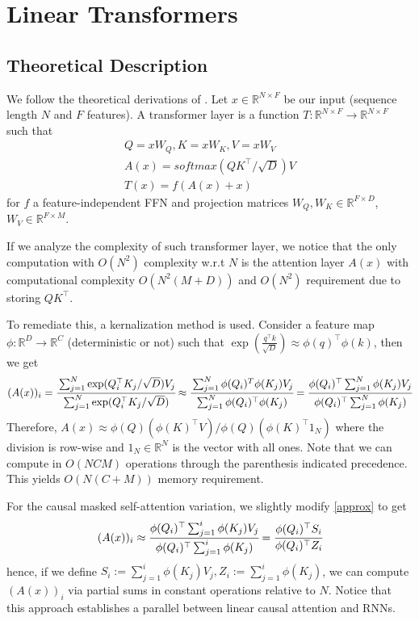 \section{Linear Transformers}
\subsection{Theoretical Description}
We follow the theoretical derivations of \cite{katharopoulos2020transformers}. Let $x \in \mathbb{R}^{N \times F}$ be our input (sequence length $N$ and $F$ features). A transformer layer is a function $T \colon \mathbb{R}^{N \times F} \to \mathbb{R}^{N \times F}$ such that 
\begin{gather*}
     Q = xW_Q, K = xW_K, V = xW_V \\
    A(x) = softmax(QK^\top / \sqrt{D}) V \\
    T(x) = f(A(x) + x)
\end{gather*}
for $f$ a feature-independent FFN and projection matrices $W_Q, W_K \in \mathbb{R}^{F \times D}$, $W_V \in\mathbb{R}^{F \times M}$.

If we analyze the complexity of such transformer layer, we notice that the only computation with $O(N^2)$ complexity w.r.t $N$ is the attention layer $A(x)$ with computational complexity $O(N^2(M + D))$ and $O(N^2)$ requirement due to storing $QK^\top$.

To remediate this, a kernalization method is used. Consider a feature map $\phi : \mathbb{R}^D \to \mathbb{R}^C$ (deterministic or not) such that $\exp(\frac{q^\top k}{\sqrt{D}}) \approx \phi(q)^\top \phi(k)$, then we get
\begin{equation}
\label{approx}
    (A(x))_i = \cfrac{\sum_{j=1}^N \exp(Q_i^\top K_j/ \sqrt{D}) V_j}{\sum_{j=1}^N \exp(Q_i^\top K_j / \sqrt{D})} \approx \cfrac{\sum_{j=1}^N \phi(Q_i)^T \phi(K_j) V_j}{\sum_{j=1}^N \phi(Q_i)^\top \phi(K_j)} = \cfrac{\phi(Q_i)^\top \sum_{j=1}^N \phi(K_j)V_j}{\phi(Q_i)^\top \sum_{j=1}^N \phi(K_j)}
\end{equation}
Therefore, $A(x) \approx \phi(Q) (\phi(K)^\top V) / \phi(Q) (\phi(K)^\top 1_N)$ where the division is row-wise and $1_N \in \mathbb{R}^N$ is the vector with all ones. Note that we can compute in $O(NCM)$ operations through the parenthesis indicated precedence. This yields $O(N(C+M))$ memory requirement. 

For the causal masked self-attention variation, we slightly modify \ref{approx} to get
\begin{equation}
    (A(x))_i \approx \cfrac{\phi(Q_i)^\top \sum_{j=1}^i \phi(K_j)V_j}{\phi(Q_i)^\top \sum_{j=1}^i \phi(K_j)} = \cfrac{\phi(Q_i)^\top S_i}{\phi(Q_i)^\top Z_i}
\end{equation}
hence, if we define $S_i := \sum_{j=1}^i \phi(K_j)V_j, Z_i := \sum_{j=1}^i \phi(K_j)$, we can compute $(A(x))_i$ via partial sums in constant operations relative to $N$. Notice that this approach establishes a parallel between linear causal attention and RNNs.

